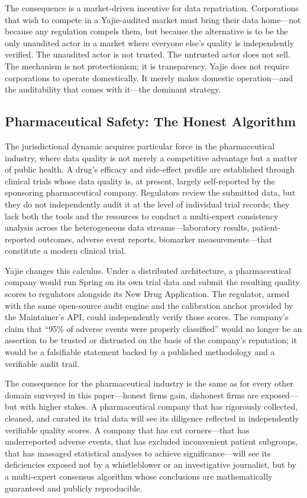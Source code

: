 \documentclass[12pt,a4paper]{article}
\theoremstyle{definition}
\theoremstyle{remark}
\begin{document}
The consequence is a market-driven incentive for data repatriation. Corporations that wish to compete in a Yajie-audited market must bring their data home—not because any regulation compels them, but because the alternative is to be the only unaudited actor in a market where everyone else's quality is independently verified. The unaudited actor is not trusted. The untrusted actor does not sell. The mechanism is not protectionism; it is transparency. Yajie does not require corporations to operate domestically. It merely makes domestic operation—and the auditability that comes with it—the dominant strategy.

\subsection{Pharmaceutical Safety: The Honest Algorithm}

The jurisdictional dynamic acquires particular force in the pharmaceutical industry, where data quality is not merely a competitive advantage but a matter of public health. A drug's efficacy and side-effect profile are established through clinical trials whose data quality is, at present, largely self-reported by the sponsoring pharmaceutical company. Regulators review the submitted data, but they do not independently audit it at the level of individual trial records; they lack both the tools and the resources to conduct a multi-expert consistency analysis across the heterogeneous data streams—laboratory results, patient-reported outcomes, adverse event reports, biomarker measurements—that constitute a modern clinical trial.

Yajie changes this calculus. Under a distributed architecture, a pharmaceutical company would run Spring on its own trial data and submit the resulting quality scores to regulators alongside its New Drug Application. The regulator, armed with the same open-source audit engine and the calibration anchor provided by the Maintainer's API, could independently verify those scores. The company's claim that ``95\% of adverse events were properly classified'' would no longer be an assertion to be trusted or distrusted on the basis of the company's reputation; it would be a falsifiable statement backed by a published methodology and a verifiable audit trail.

The consequence for the pharmaceutical industry is the same as for every other domain surveyed in this paper—honest firms gain, dishonest firms are exposed—but with higher stakes. A pharmaceutical company that has rigorously collected, cleaned, and curated its trial data will see its diligence reflected in independently verifiable quality scores. A company that has cut corners—that has underreported adverse events, that has excluded inconvenient patient subgroups, that has massaged statistical analyses to achieve significance—will see its deficiencies exposed not by a whistleblower or an investigative journalist, but by a multi-expert consensus algorithm whose conclusions are mathematically guaranteed and publicly reproducible.
\end{document}
